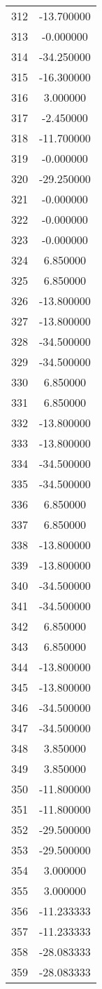 \documentclass[12pt]{article}
\begin{document}
\begin{longtable}{@{}cc@{}}
312 & -13.700000 \\
313 & -0.000000 \\
314 & -34.250000 \\
315 & -16.300000 \\
316 & 3.000000 \\
317 & -2.450000 \\
318 & -11.700000 \\
319 & -0.000000 \\
320 & -29.250000 \\
321 & -0.000000 \\
322 & -0.000000 \\
323 & -0.000000 \\
324 & 6.850000 \\
325 & 6.850000 \\
326 & -13.800000 \\
327 & -13.800000 \\
328 & -34.500000 \\
329 & -34.500000 \\
330 & 6.850000 \\
331 & 6.850000 \\
332 & -13.800000 \\
333 & -13.800000 \\
334 & -34.500000 \\
335 & -34.500000 \\
336 & 6.850000 \\
337 & 6.850000 \\
338 & -13.800000 \\
339 & -13.800000 \\
340 & -34.500000 \\
341 & -34.500000 \\
342 & 6.850000 \\
343 & 6.850000 \\
344 & -13.800000 \\
345 & -13.800000 \\
346 & -34.500000 \\
347 & -34.500000 \\
348 & 3.850000 \\
349 & 3.850000 \\
350 & -11.800000 \\
351 & -11.800000 \\
352 & -29.500000 \\
353 & -29.500000 \\
354 & 3.000000 \\
355 & 3.000000 \\
356 & -11.233333 \\
357 & -11.233333 \\
358 & -28.083333 \\
359 & -28.083333 \\

\end{longtable}
\end{document}
